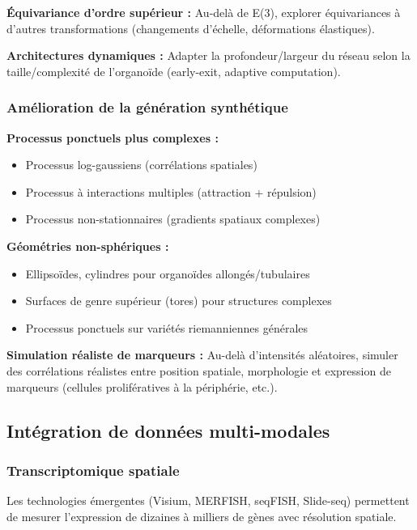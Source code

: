 \textbf{Équivariance d'ordre supérieur :}
Au-delà de E(3), explorer équivariances à d'autres transformations (changements d'échelle, déformations élastiques).

\textbf{Architectures dynamiques :}
Adapter la profondeur/largeur du réseau selon la taille/complexité de l'organoïde (early-exit, adaptive computation).

\subsubsection{Amélioration de la génération synthétique}

\textbf{Processus ponctuels plus complexes :}
\begin{itemize}
    \item Processus log-gaussiens (corrélations spatiales)
    \item Processus à interactions multiples (attraction + répulsion)
    \item Processus non-stationnaires (gradients spatiaux complexes)
\end{itemize}

\textbf{Géométries non-sphériques :}
\begin{itemize}
    \item Ellipsoïdes, cylindres pour organoïdes allongés/tubulaires
    \item Surfaces de genre supérieur (tores) pour structures complexes
    \item Processus ponctuels sur variétés riemanniennes générales
\end{itemize}

\textbf{Simulation réaliste de marqueurs :}
Au-delà d'intensités aléatoires, simuler des corrélations réalistes entre position spatiale, morphologie et expression de marqueurs (cellules prolifératives à la périphérie, etc.).

\subsection{Intégration de données multi-modales}

\subsubsection{Transcriptomique spatiale}

Les technologies émergentes (Visium, MERFISH, seqFISH, Slide-seq) permettent de mesurer l'expression de dizaines à milliers de gènes avec résolution spatiale.

